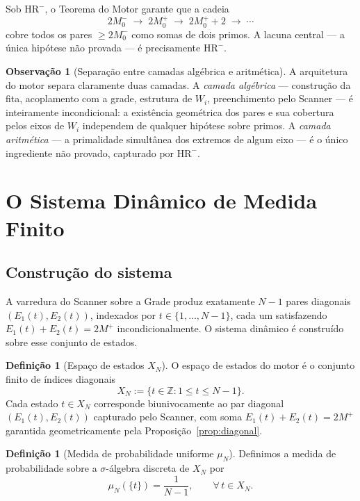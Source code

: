 \documentclass[12pt,a4paper]{article}
\theoremstyle{definition}
\newtheorem{definition}[theorem]{Definição}
\newtheorem{remark}[theorem]{Observação}
\newcommand{\Z}{\mathbb{Z}}
\newcommand{\HRm}{\mathrm{HR}^{-}}
\begin{document}
	Sob $\HRm$, o Teorema do Motor \cite[Thm.~9.1]{motor} garante que
	a cadeia
	\[
	2M_0^- \;\to\; 2M_0^+ \;\to\; 2M_0^+ + 2 \;\to\; \cdots
	\]
	cobre todos os pares $\geq 2M_0^-$ como somas de dois primos.
	A lacuna central — a única hipótese não provada — é precisamente
	$\HRm$.
	
	\begin{remark}[Separação entre camadas algébrica e aritmética]
		A arquitetura do motor separa claramente duas camadas. A
		\emph{camada algébrica} — construção da fita, acoplamento com
		a grade, estrutura de $W_i$, preenchimento pelo Scanner — é
		inteiramente incondicional: a existência geométrica dos pares e
		sua cobertura pelos eixos de $W_i$ independem de qualquer
		hipótese sobre primos. A \emph{camada aritmética} — a
		primalidade simultânea dos extremos de algum eixo — é o único
		ingrediente não provado, capturado por $\HRm$.
	\end{remark}
	
	\section{O Sistema Dinâmico de Medida Finito}
	\label{sec:dinamica}
	
	\subsection{Construção do sistema}
	
	A varredura do Scanner sobre a Grade produz exatamente $N-1$ pares
	diagonais $(E_1(t), E_2(t))$, indexados por $t \in \{1,\ldots,N-1\}$,
	cada um satisfazendo $E_1(t)+E_2(t)=2M^+$ incondicionalmente. O
	sistema dinâmico é construído sobre esse conjunto de estados.
	
	\begin{definition}[Espaço de estados $X_N$]
		\label{def:estados}
		O espaço de estados do motor é o conjunto finito de índices
		diagonais
		\[
		X_N := \{t \in \Z : 1 \leq t \leq N-1\}.
		\]
		Cada estado $t \in X_N$ corresponde biunivocamente ao par
		diagonal $(E_1(t), E_2(t))$ capturado pelo Scanner, com soma
		$E_1(t)+E_2(t)=2M^+$ garantida geometricamente pela
		Proposição~\ref{prop:diagonal}.
	\end{definition}
	
	\begin{definition}[Medida de probabilidade uniforme $\mu_N$]
		Definimos a medida de probabilidade sobre a $\sigma$-álgebra
		discreta de $X_N$ por
		\[
		\mu_N(\{t\}) = \frac{1}{N-1},\qquad \forall\, t \in X_N.
		\]
	\end{definition}
	
\end{document}
